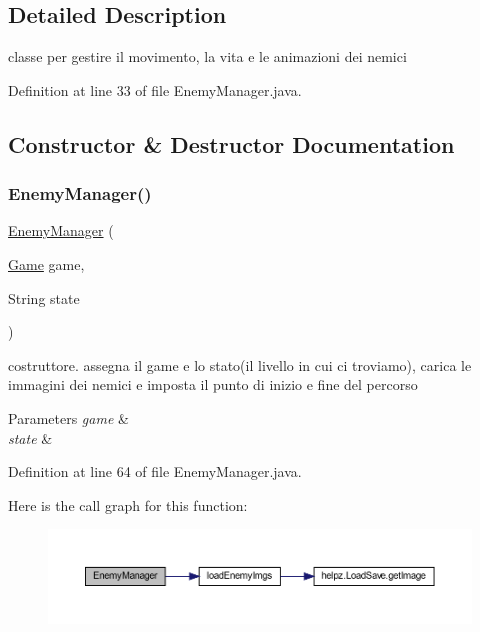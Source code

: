 \subsection{Detailed Description}
classe per gestire il movimento, la vita e le animazioni dei nemici 

Definition at line 33 of file Enemy\+Manager.\+java.



\subsection{Constructor \& Destructor Documentation}
\mbox{\label{classmanagers_1_1_enemy_manager_ab48b3c6b84a71fc0278ad44f818701c6}} 
\subsubsection{\texorpdfstring{Enemy\+Manager()}{EnemyManager()}}
{\footnotesize\ttfamily \hyperlink{classmanagers_1_1_enemy_manager}{Enemy\+Manager} (\begin{DoxyParamCaption}\item[{\hyperlink{classprogetto_1_1_game}{Game}}]{game,  }\item[{String}]{state }\end{DoxyParamCaption})}



costruttore. assegna il game e lo stato(il livello in cui ci troviamo), carica le immagini dei nemici e imposta il punto di inizio e fine del percorso 


\begin{DoxyParams}{Parameters}
{\em game} & \\
\hline
{\em state} & \\
\hline
\end{DoxyParams}


Definition at line 64 of file Enemy\+Manager.\+java.

Here is the call graph for this function\+:
\nopagebreak
\begin{figure}[H]
\begin{center}
\leavevmode
\includegraphics[width=350pt]{classmanagers_1_1_enemy_manager_ab48b3c6b84a71fc0278ad44f818701c6_cgraph}
\end{center}
\end{figure}


